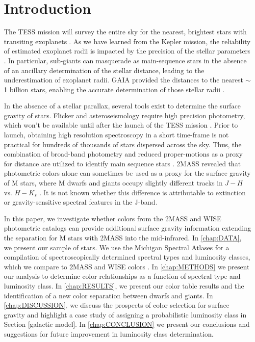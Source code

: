 \chapter{Introduction} \label{chap:introduction}

The TESS mission will survey the entire sky for the nearest, brightest stars with transiting exoplanets \citep{Ricker2015,Sullivan2015}.  As we have learned from the Kepler mission, the reliability of estimated exoplanet radii is impacted by the precision of the stellar parameters \citep{Plavchan14,Kane14,Howell14,Bastien14,Mann12}. In particular, sub-giants can masquerade as main-sequence stars in the absence of an ancillary determination of the stellar distance, leading to the underestimation of exoplanet radii. GAIA  provided the distances to the nearest $\sim$1 billion stars, enabling the accurate determination of those stellar radii \citep{Prusti2016,Brown2016,Lindegren2016,Stassun2016}. 

In the absence of a stellar parallax, several tools exist to determine the surface gravity of stars.  Flicker and asteroseismology require high precision photometry, which won't be available until after the launch of the TESS mission \citep{Bastien2013,Bastien2016}. Prior to launch, obtaining high resolution spectroscopy in a short time-frame is not practical for hundreds of thousands of stars dispersed across the sky.  Thus, the combination of broad-band photometry and reduced proper-motions as a proxy for distance are utilized to identify main sequence stars \citep{Bastien2016,Huber2014,Lepine2011,Brown2011,Gould2003}. 2MASS revealed that photometric colors alone can sometimes be used as a proxy for the surface gravity of M stars, where M dwarfs and giants occupy slightly different tracks in $J-H$ vs. $H-K_s$ \citep{Ciardi2011,Plavchan2008,Plavchan2006,Skrutskie2006}.  It is not known whether this difference is attributable to extinction or gravity-sensitive spectral features in the J-band.  

In this paper, we investigate whether colors from the 2MASS and WISE photometric catalogs can provide additional surface gravity information extending the separation for M stars with 2MASS into the mid-infrared. In \autoref{chap:DATA}, we present our sample of stars. We use the Michigan Spectral Atlases for a compilation of spectroscopically determined spectral types and luminosity classes, which we compare to 2MASS and WISE colors \citep{Houk1982,Houk1988,Houk1999}.  In \autoref{chap:METHODS} we present our analysis to determine color relationships as a function of spectral type and luminosity class.  In \autoref{chap:RESULTS}, we present our color table results and the identification of a new color separation between dwarfs and giants.  In \autoref{chap:DISCUSSION}, we discuss the prospects of color selection for surface gravity and highlight a case study of assigning a probabilistic luminosity class in Section [galactic  model].  In \autoref{chap:CONCLUSION} we present our conclusions and suggestions for future improvement in luminosity class determination.




